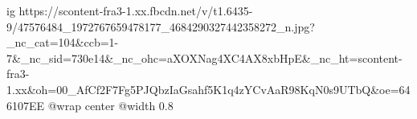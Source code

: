  
 
 
 
 

\ifcmt
  ig https://scontent-fra3-1.xx.fbcdn.net/v/t1.6435-9/47576484_1972767659478177_4684290327442358272_n.jpg?_nc_cat=104&ccb=1-7&_nc_sid=730e14&_nc_ohc=aXOXNag4XC4AX8xbHpE&_nc_ht=scontent-fra3-1.xx&oh=00_AfCf2F7Fg5PJQbzIaGsahf5K1q4zYCvAaR98KqN0s9UTbQ&oe=646107EE
  @wrap center
  @width 0.8
\fi

